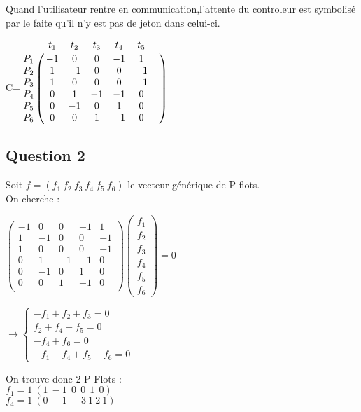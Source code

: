 Quand l'utilisateur rentre en communication,l'attente du controleur est symbolisé par le faite qu'il n'y est pas de jeton dans celui-ci.

\begin{center}

{\Huge C}\qquad =\qquad $\bordermatrix{
&t_1&t_2&t_3&t_4&t_5&\cr
P_1&-1&0&0&-1&1\cr
P_2&1&-1&0&0&-1\cr
P_3&1&0&0&0&-1\cr
P_4&0&1&-1&-1&0\cr
P_5&0&-1&0&1&0\cr
P_6&0&0&1&-1&0\cr
}$

\end{center}

\subsection{Question 2}
Soit $f=(f_1\ f_2\ f_3\ f_4\ f_5\ f_6)$ le vecteur générique de P-flots.\\
On cherche : 
\begin{center}
$\begin{pmatrix}
-1 & 0 & 0 & -1 & 1\\
 1 & -1 & 0 & 0 & -1\\
 1 & 0 & 0 & 0 & -1\\
 0 & 1 & -1 & -1 & 0\\
 0 & -1 & 0 & 1 & 0\\ 
 0 & 0 & 1 & -1 & 0\\
\end{pmatrix}
\begin{pmatrix}
f_1\\
f_2\\ 
f_3\\ 
f_4\\ 
f_5\\ 
f_6
\end{pmatrix}
=0
$

\vspace{0.5cm}

$\rightarrow 
\begin{cases}
-f_1 + f_2 + f_3 = 0\\
f_2 + f_4 - f_5  = 0\\
-f_4 + f_6  = 0\\
-f_1 - f_4 + f_5 - f_6 = 0
\end{cases}$

\vspace{0.5cm}
On trouve donc 2 P-Flots :\\
$
f_1 = 1 \ (1 \ -1 \ \ 0 \ \ 0 \ \ 1 \ \ 0)
$
\\
$
f_4 = 1 \ (0 \ -1 \ -3 \ 1 \ 2 \ 1)
$

\end{center}